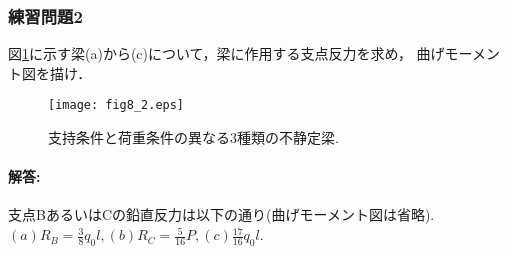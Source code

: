 ﻿\documentclass[10pt,a4j]{jarticle}
\begin{document}
\subsubsection{練習問題2}
図\ref{fig:fig8_2}に示す梁(a)から(c)について，梁に作用する支点反力を求め，
曲げモーメント図を描け．
\begin{figure}[h]
	\begin{center}
	\texttt{[image: fig8\_2.eps]} 
	\end{center}
	\caption{支持条件と荷重条件の異なる3種類の不静定梁. } 
	\label{fig:fig8_2}
\end{figure}
\paragraph{解答:}
支点BあるいはCの鉛直反力は以下の通り(曲げモーメント図は省略).\\
$(a)R_B=\frac{3}{8}q_0l, (b)R_C=\frac{5}{16}P, (c)\frac{17}{16}q_0l$.
\end{document}
